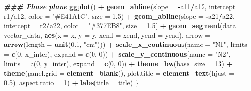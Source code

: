 \documentclass[
]{book}
\newenvironment{Shaded}{\begin{snugshade}}{\end{snugshade}}
\newcommand{\AttributeTok}[1]{\textcolor[rgb]{0.13,0.29,0.53}{#1}}
\newcommand{\DecValTok}[1]{\textcolor[rgb]{0.00,0.00,0.81}{#1}}
\newcommand{\DocumentationTok}[1]{\textcolor[rgb]{0.56,0.35,0.01}{\textbf{\textit{#1}}}}
\newcommand{\FloatTok}[1]{\textcolor[rgb]{0.00,0.00,0.81}{#1}}
\newcommand{\FunctionTok}[1]{\textcolor[rgb]{0.13,0.29,0.53}{\textbf{#1}}}
\newcommand{\NormalTok}[1]{#1}
\newcommand{\SpecialCharTok}[1]{\textcolor[rgb]{0.81,0.36,0.00}{\textbf{#1}}}
\newcommand{\StringTok}[1]{\textcolor[rgb]{0.31,0.60,0.02}{#1}}
\begin{document}
\begin{Shaded}
\begin{Highlighting}[]
    \DocumentationTok{\#\#\# Phase plane}
    \FunctionTok{ggplot}\NormalTok{() }\SpecialCharTok{+}
      \FunctionTok{geom\_abline}\NormalTok{(}\AttributeTok{slope =} \SpecialCharTok{{-}}\NormalTok{a11}\SpecialCharTok{/}\NormalTok{a12, }\AttributeTok{intercept =}\NormalTok{ r1}\SpecialCharTok{/}\NormalTok{a12, }
                  \AttributeTok{color =} \StringTok{"\#E41A1C"}\NormalTok{, }\AttributeTok{size =} \FloatTok{1.5}\NormalTok{) }\SpecialCharTok{+}
      \FunctionTok{geom\_abline}\NormalTok{(}\AttributeTok{slope =} \SpecialCharTok{{-}}\NormalTok{a21}\SpecialCharTok{/}\NormalTok{a22, }\AttributeTok{intercept =}\NormalTok{ r2}\SpecialCharTok{/}\NormalTok{a22, }
                  \AttributeTok{color =} \StringTok{"\#377EB8"}\NormalTok{, }\AttributeTok{size =} \FloatTok{1.5}\NormalTok{) }\SpecialCharTok{+}
      \FunctionTok{geom\_segment}\NormalTok{(}\AttributeTok{data =}\NormalTok{ vector\_data,}
                   \FunctionTok{aes}\NormalTok{(}\AttributeTok{x =}\NormalTok{ x, }\AttributeTok{y =}\NormalTok{ y, }\AttributeTok{xend =}\NormalTok{ xend, }\AttributeTok{yend =}\NormalTok{ yend),}
                   \AttributeTok{arrow =} \FunctionTok{arrow}\NormalTok{(}\AttributeTok{length =} \FunctionTok{unit}\NormalTok{(}\FloatTok{0.1}\NormalTok{, }\StringTok{"cm"}\NormalTok{))) }\SpecialCharTok{+}    
      \FunctionTok{scale\_x\_continuous}\NormalTok{(}\AttributeTok{name =} \StringTok{"N1"}\NormalTok{, }\AttributeTok{limits =} \FunctionTok{c}\NormalTok{(}\DecValTok{0}\NormalTok{, x\_inter), }\AttributeTok{expand =} \FunctionTok{c}\NormalTok{(}\DecValTok{0}\NormalTok{, }\DecValTok{0}\NormalTok{)) }\SpecialCharTok{+}
      \FunctionTok{scale\_y\_continuous}\NormalTok{(}\AttributeTok{name =} \StringTok{"N2"}\NormalTok{, }\AttributeTok{limits =} \FunctionTok{c}\NormalTok{(}\DecValTok{0}\NormalTok{, y\_inter), }\AttributeTok{expand =} \FunctionTok{c}\NormalTok{(}\DecValTok{0}\NormalTok{, }\DecValTok{0}\NormalTok{)) }\SpecialCharTok{+}
      \FunctionTok{theme\_bw}\NormalTok{(}\AttributeTok{base\_size =} \DecValTok{13}\NormalTok{) }\SpecialCharTok{+}
      \FunctionTok{theme}\NormalTok{(}\AttributeTok{panel.grid =} \FunctionTok{element\_blank}\NormalTok{(),}
            \AttributeTok{plot.title =} \FunctionTok{element\_text}\NormalTok{(}\AttributeTok{hjust =} \FloatTok{0.5}\NormalTok{),}
            \AttributeTok{aspect.ratio =} \DecValTok{1}\NormalTok{) }\SpecialCharTok{+}
      \FunctionTok{labs}\NormalTok{(}\AttributeTok{title =}\NormalTok{ title)}
\NormalTok{  \}}
\end{Highlighting}
\end{Shaded}
\end{document}
